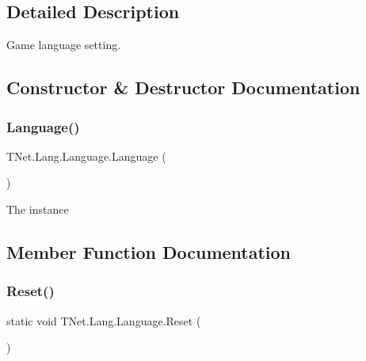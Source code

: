 \subsection{Detailed Description}
Game language setting. 



\subsection{Constructor \& Destructor Documentation}
\mbox{\label{class_t_net_1_1_lang_1_1_language_a57ccd81a99a702a7f06b6dc0ef43a16d}} 
\subsubsection{\texorpdfstring{Language()}{Language()}}
{\footnotesize\ttfamily T\+Net.\+Lang.\+Language.\+Language (\begin{DoxyParamCaption}{ }\end{DoxyParamCaption})\hspace{0.3cm}{\ttfamily [protected]}}



The instance 



\subsection{Member Function Documentation}
\mbox{\label{class_t_net_1_1_lang_1_1_language_aa1896863a4e71b42b4f55133c668dbe0}} 
\subsubsection{\texorpdfstring{Reset()}{Reset()}}
{\footnotesize\ttfamily static void T\+Net.\+Lang.\+Language.\+Reset (\begin{DoxyParamCaption}{ }\end{DoxyParamCaption})\hspace{0.3cm}{\ttfamily [static]}}



